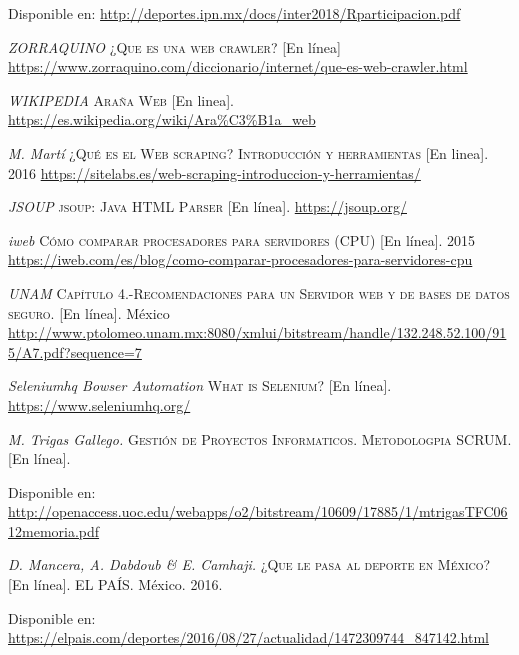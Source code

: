 \begin{thebibliography}{}
	Disponible en: 
	\url{http://deportes.ipn.mx/docs/inter2018/Rparticipacion.pdf}
	
	\textit{ZORRAQUINO}
	\textsc{¿Que es una web crawler?}
	[En línea]
	\url{https://www.zorraquino.com/diccionario/internet/que-es-web-crawler.html}
	
	\textit{WIKIPEDIA}
	\textsc{Araña Web}
	[En linea].
	\newline
	\url{https://es.wikipedia.org/wiki/Ara\%C3\%B1a_web}
	
	\textit{M. Martí}
	\textsc{¿Qué es el Web scraping? Introducción y herramientas}
	[En linea]. 2016
	\url{https://sitelabs.es/web-scraping-introduccion-y-herramientas/}
	
	\textit{JSOUP}
	\textsc{jsoup: Java HTML Parser}
	[En línea].
	\newline
	\url{https://jsoup.org/}
	
	\textit{iweb}
	\textsc{Cómo comparar procesadores para servidores (CPU)}
	[En línea]. 2015
	\newline
	\url{https://iweb.com/es/blog/como-comparar-procesadores-para-servidores-cpu}
	
	\textit{UNAM}
	\textsc{Capítulo 4.-Recomendaciones para un Servidor web y de bases de datos seguro.}
	[En línea]. México
	\newline
	\url{http://www.ptolomeo.unam.mx:8080/xmlui/bitstream/handle/132.248.52.100/915/A7.pdf?sequence=7}
	
	
	
	\textit{Seleniumhq Bowser Automation}
	\textsc{What is Selenium?}
	[En línea].
	\newline
	\url{https://www.seleniumhq.org/}

	
	\textit{M. Trigas Gallego.}
	\textsc{Gestión de Proyectos Informaticos. Metodologpia SCRUM.} [En línea].
	
	Disponible en: 
	\url{http://openaccess.uoc.edu/webapps/o2/bitstream/10609/17885/1/mtrigasTFC0612memoria.pdf}	

	\textit{D. Mancera, A. Dabdoub \& E. Camhaji.}
	\textsc{¿Que le pasa al deporte en México?} [En línea].
	EL PAÍS. México. 2016.
	
	Disponible en: 
	\url{https://elpais.com/deportes/2016/08/27/actualidad/1472309744_847142.html}	


\end{thebibliography}
